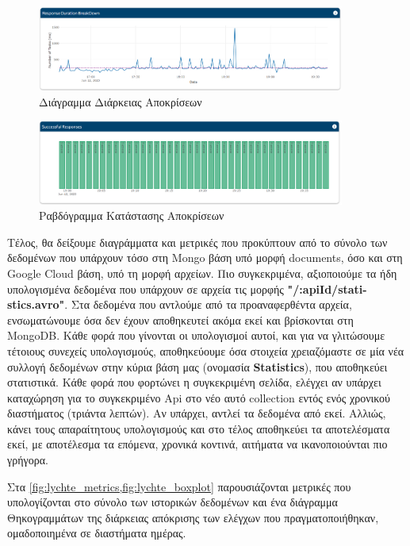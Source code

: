 \begin{figure}[!ht]
	\centering
	\includegraphics[width=0.9\textwidth]{./images/chapter5/response_duration_breakdown.png}
	\caption[Διάγραμμα Διάρκειας Αποκρίσεων]{Διάγραμμα Διάρκειας Αποκρίσεων}
	\label{fig:lychte_response_duration_breakdown}
\end{figure}	
\begin{figure}[!ht]
	\centering
	\includegraphics[width=0.9\textwidth]{./images/chapter5/succesfull_responses.png}
	\caption[Ραβδόγραμμα Κατάστασης Αποκρίσεων]{Ραβδόγραμμα Κατάστασης Αποκρίσεων}
	\label{fig:lychte_succesfull_responses}
\end{figure}

Tέλος, θα δείξουμε διαγράμματα και μετρικές που προκύπτουν από το σύνολο των δεδομένων που υπάρχουν
τόσο στη Mongo βάση υπό μορφή documents, όσο και στη Google Cloud βάση, υπό τη μορφή αρχείων. Πιο συγκεκριμένα, αξιοποιούμε
τα ήδη υπολογισμένα δεδομένα που υπάρχουν σε αρχεία τις μορφής \textbf{"/:apiId/stati\hyp{}stics.avro"}. Στα
δεδομένα που αντλούμε από τα προαναφερθέντα αρχεία, ενσωματώνουμε όσα δεν έχουν αποθηκευτεί ακόμα εκεί και βρίσκονται
στη MongoDB. Κάθε φορά που γίνονται οι υπολογισμοί αυτοί, και για να γλιτώσουμε τέτοιους συνεχείς
υπολογισμούς, αποθηκεύουμε όσα στοιχεία χρειαζόμαστε σε μία νέα συλλογή δεδομένων στην κύρια βάση μας (ονομασία \textbf{Statistics}), που αποθηκεύει
στατιστικά. Κάθε φορά που φορτώνει η συγκεκριμένη σελίδα, ελέγχει αν υπάρχει καταχώρηση για το συγκεκριμένο Api στο νέο αυτό collection εντός
ενός χρονικού διαστήματος (τριάντα λεπτών). Αν υπάρχει, αντλεί τα δεδομένα από εκεί. Αλλιώς, κάνει τους απαραίτητους υπολογισμούς και στο τέλος
αποθηκεύει τα αποτελέσματα εκεί, με αποτέλεσμα τα επόμενα, χρονικά κοντινά, αιτήματα να ικανοποιούνται πιο γρήγορα.

Στα \cref{fig:lychte_metrics,fig:lychte_boxplot} παρουσιάζονται μετρικές που υπολογίζονται στο σύνολο των ιστορικών δεδομένων
και ένα διάγραμμα Θηκογραμμάτων της διάρκειας απόκρισης των ελέγχων που πραγματοποιήθηκαν, ομαδοποιημένα σε διαστήματα ημέρας.   

